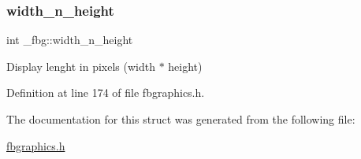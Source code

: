 \mbox{\label{struct__fbg_a1ab3f10e8c3483d7286db9850511d46d}} 
\subsubsection{\texorpdfstring{width\+\_\+n\+\_\+height}{width\_n\_height}}
{\footnotesize\ttfamily int \+\_\+fbg\+::width\+\_\+n\+\_\+height}



Display lenght in pixels (width $\ast$ height) 



Definition at line 174 of file fbgraphics.\+h.



The documentation for this struct was generated from the following file\+:\begin{DoxyCompactItemize}
\item 
\hyperlink{fbgraphics_8h}{fbgraphics.\+h}\end{DoxyCompactItemize}
